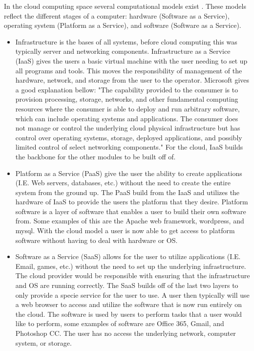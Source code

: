 \documentclass[12pt]{article}
\begin{document}
In the cloud computing space several computational models exist \cite{neto2011demystifying}. These models reflect the different stages of a computer: hardware (Software as a Service), operating system (Platform as a Service), and software (Software as a Service).

\begin{itemize}
    \item Infrastructure is the bases of all systems, before cloud computing this was typically server and networking components. Infrastructure as a Service (IaaS) gives the users a basic virtual machine with the user needing to set up all programs and tools. This moves the responsibility of management of the hardware, network, and storage from the user to the operator.  Microsoft gives a good explanation bellow: "The capability provided to the consumer is to provision processing, storage, networks, and other fundamental computing resources where the consumer is able to deploy and run arbitrary software, which can include operating systems and applications. The consumer does not manage or control the underlying cloud physical infrastructure but has control over operating systems, storage, deployed applications, and possibly limited control of select networking components." \cite{TechWikiMic} For the cloud, IaaS builds the backbone for the other modules to be built off of.

    \item Platform as a Service (PaaS) give the user the ability to create applications (I.E. Web servers, databases, etc.) without the need to create the entire system from the ground up. The PaaS build from the IaaS and utilizes the hardware of IaaS to provide the users the platform that they desire. Platform software is a layer of software that enables a user to build their own software from. Some examples of this are the Apache web framework, wordpress, and mysql. With the cloud model a user is now able to get access to platform software without having to deal with hardware or OS.

    \item Software as a Service (SaaS) allows for the user to utilize applications (I.E. Email, games, etc.) without the need to set up the underlying infrastructure. The cloud provider would be responsible with ensuring that the infrastructure and OS are running correctly. The SaaS builds off of the last two layers to only provide a specie service for the user to use. A user then typically will use a web browser to access and utilize the software that is now run entirely on the cloud. The software is used by users to perform tasks that a user would like to perform, some examples of software are Office 365, Gmail, and Photoshop CC.  The user has no access the underlying network, computer system, or storage.

\end{itemize}
\end{document}
